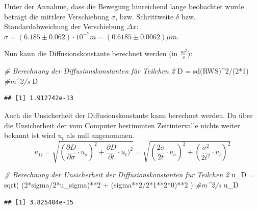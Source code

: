 \documentclass[
  9pt,
]{article}
\newenvironment{Shaded}{\begin{snugshade}}{\end{snugshade}}
\newcommand{\CommentTok}[1]{\textcolor[rgb]{0.56,0.35,0.01}{\textit{#1}}}
\newcommand{\DecValTok}[1]{\textcolor[rgb]{0.00,0.00,0.81}{#1}}
\newcommand{\FunctionTok}[1]{\textcolor[rgb]{0.00,0.00,0.00}{#1}}
\newcommand{\NormalTok}[1]{#1}
\newcommand{\OtherTok}[1]{\textcolor[rgb]{0.56,0.35,0.01}{#1}}
\newcommand{\SpecialCharTok}[1]{\textcolor[rgb]{0.00,0.00,0.00}{#1}}
\begin{document}
Unter der Annahme, dass die Bewegung hinreichend lange beobachtet wurde
beträgt die mittlere Verschiebung \(\sigma\), bzw. Schrittweite
\(\delta\) bzw. Standardabweichung der Verschiebung \(\Delta x\):
\(\sigma = (6.185 \pm 0.062 )\cdot 10^{-7}m = (0.6185 \pm 0.0062 )\mu m\).

Nun kann die Diffusionskonstante berechnet werden (in
\(\frac{m^2}{s}\)):

\begin{Shaded}
\begin{Highlighting}[]
\CommentTok{\# Berechnung der Diffusionskonstanten für Teilchen 2}
\NormalTok{D }\OtherTok{=} \FunctionTok{sd}\NormalTok{(RWS)}\SpecialCharTok{\^{}}\DecValTok{2}\SpecialCharTok{/}\NormalTok{(}\DecValTok{2}\SpecialCharTok{*}\DecValTok{1}\NormalTok{) }\CommentTok{\#m\^{}2/s}
\NormalTok{D}
\end{Highlighting}
\end{Shaded}

\begin{verbatim}
## [1] 1.912742e-13
\end{verbatim}

Auch die Unsicherheit der Diffusionskonstante kann berechnet werden. Da
über die Unsicherheit der vom Computer bestimmten Zeitintervalle nichts
weiter bekannt ist wird \(u_t\) als null angenommen.
\[u_D = \sqrt{(\frac{\partial D}{\partial \sigma}\cdot u_{\sigma})^2 + \frac{\partial D}{\partial t}\cdot u_{t})^2}= \sqrt{(\frac{2\sigma}{2t}\cdot u_{\sigma})^2+(\frac{\sigma^2}{2t^2}\cdot u_t)^2}\]

\begin{Shaded}
\begin{Highlighting}[]
\CommentTok{\# Berechnung der Unsicherheit der Diffusionskonstanten für Teilchen 2}
\NormalTok{u\_D }\OtherTok{=} \FunctionTok{sqrt}\NormalTok{( (}\DecValTok{2}\SpecialCharTok{*}\NormalTok{sigma}\SpecialCharTok{/}\DecValTok{2}\SpecialCharTok{*}\NormalTok{u\_sigma)}\SpecialCharTok{**}\DecValTok{2} \SpecialCharTok{+}\NormalTok{ (sigma}\SpecialCharTok{**}\DecValTok{2}\SpecialCharTok{/}\DecValTok{2}\SpecialCharTok{*}\DecValTok{1}\SpecialCharTok{**}\DecValTok{2}\SpecialCharTok{*}\DecValTok{0}\NormalTok{)}\SpecialCharTok{**}\DecValTok{2}\NormalTok{ ) }\CommentTok{\#m\^{}2/s}
\NormalTok{u\_D}
\end{Highlighting}
\end{Shaded}

\begin{verbatim}
## [1] 3.825484e-15
\end{verbatim}
\end{document}
